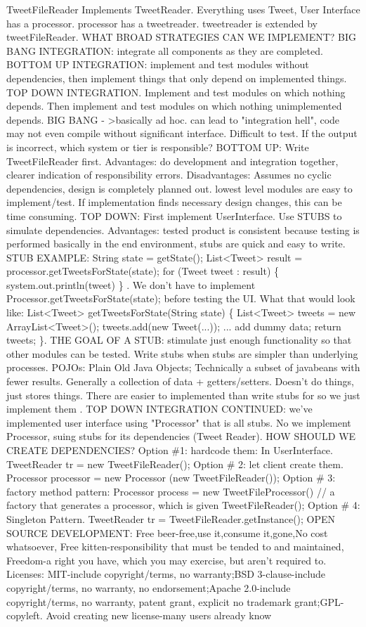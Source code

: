 \documentclass[10pt]{article}
\begin{document}
\begin{landscape}
\begin{multicols*}{6}
TweetFileReader Implements TweetReader. Everything uses Tweet, User Interface has a processor. processor has a tweetreader. tweetreader is extended by tweetFileReader. WHAT BROAD STRATEGIES CAN WE IMPLEMENT? BIG BANG INTEGRATION: integrate all components as they are completed. BOTTOM UP INTEGRATION: implement and test modules without dependencies, then implement things that only depend on implemented things. TOP DOWN INTEGRATION. Implement and test modules on which nothing depends. Then implement and test modules on which nothing unimplemented depends. BIG BANG - >basically ad hoc. can lead to "integration hell", code may not even compile without significant interface. Difficult to test. If the output is incorrect, which system or tier is responsible? BOTTOM UP: Write TweetFileReader first. Advantages: do development and integration together, clearer indication of responsibility errors. Disadvantages: Assumes no cyclic dependencies, design is completely planned out. lowest level modules are easy to implement/test. If implementation finds necessary design changes, this can be time consuming. TOP DOWN: First implement UserInterface. Use STUBS to simulate dependencies. Advantages: tested product is consistent because testing is performed basically in the end environment, stubs are quick and easy to write. STUB EXAMPLE: String state = getState(); List<Tweet> result = processor.getTweetsForState(state); for (Tweet tweet : result) \{ system.out.println(tweet) \} . We don't have to implement Processor.getTweetsForState(state); before testing the UI. What that would look like: List<Tweet> getTweetsForState(String state) \{ List<Tweet> tweets = new ArrayList<Tweet>(); tweets.add(new Tweet(...)); ... add dummy data; return tweets; \}. THE GOAL OF A STUB: stimulate just enough functionality so that other modules can be tested. Write stubs when stubs are simpler than underlying processes. POJOs: Plain Old Java Objects; Technically a subset of javabeans with fewer results. Generally a collection of data + getters/setters.  Doesn't do things, just stores things. There are easier to implemented than write stubs for so we just implement them . TOP DOWN INTEGRATION CONTINUED: we've implemented user interface using "Processor" that is all stubs. No we implement Processor, suing stubs for its dependencies (Tweet Reader). HOW SHOULD WE CREATE DEPENDENCIES? Option \#1: hardcode them: In UserInterface. TweetReader tr = new TweetFileReader(); Option \# 2: let client create them. Processor processor = new Processor (new TweetFileReader()); Option \# 3: factory method pattern: Processor process = new TweetFileProcessor() // a factory that generates a processor, which is given TweetFileReader(); Option \# 4: Singleton Pattern. TweetReader tr = TweetFileReader.getInstance();  OPEN SOURCE DEVELOPMENT: Free beer-free,use it,consume it,gone,No cost whatsoever, Free kitten-responsibility that must be tended to and maintained, Freedom-a right you have, which you may exercise, but aren't required to. Licenses: MIT-include copyright/terms, no warranty;BSD 3-clause-include copyright/terms, no warranty, no endorsement;Apache 2.0-include copyright/terms, no warranty, patent grant, explicit no trademark grant;GPL-copyleft. Avoid creating new license-many users already know 
\end{multicols*}
\end{landscape}
\end{document}
